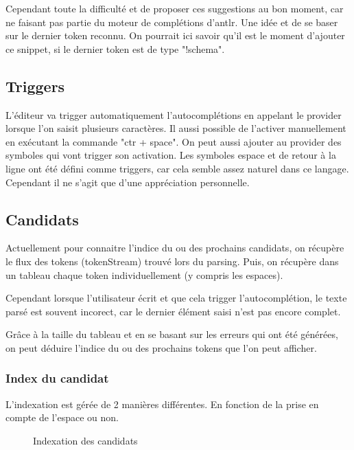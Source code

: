\documentclass[
    iict, %
    il, %
]{heig-tb}
\begin{document}
Cependant toute la difficulté et de proposer ces suggestions au bon moment, car ne faisant pas partie du moteur de complétions d'antlr. Une idée et de se baser sur le dernier token reconnu. On pourrait ici savoir qu'il est le moment d'ajouter ce snippet, si le dernier token est de type "!schema".

\subsection{Triggers}
L'éditeur va trigger automatiquement l'autocomplétions en appelant le provider lorsque l'on saisit plusieurs caractères. Il aussi possible de l'activer manuellement en exécutant la commande "ctr + space".
On peut aussi ajouter au provider des symboles qui vont trigger son activation. Les symboles espace et de retour à la ligne ont été défini comme triggers, car cela semble assez naturel dans ce langage. Cependant il ne s'agit que d'une appréciation personnelle.

\subsection{Candidats}\label{candidates}

Actuellement pour connaitre l'indice du ou des prochains candidats, on récupère le flux des tokens (tokenStream) trouvé lors du parsing.
Puis, on récupère dans un tableau chaque token individuellement (y compris les espaces).

Cependant lorsque l'utilisateur écrit et que cela trigger l'autocomplétion, le texte parsé est souvent incorect, car le dernier élément saisi n'est pas encore complet.

Grâce à la taille du tableau et en se basant sur les erreurs qui ont été générées, on peut déduire l'indice du ou des prochains tokens que l'on peut afficher.

\subsubsection{Index du candidat}
L'indexation est gérée de 2 manières différentes. En fonction de la prise en compte de l'espace ou non.

\begin{figure}[!h]
    \begin{center}
    \end{center}
    \caption[Indexation des candidats]{\label{candidat-index} Indexation des candidats}
\end{figure}
\end{document}
